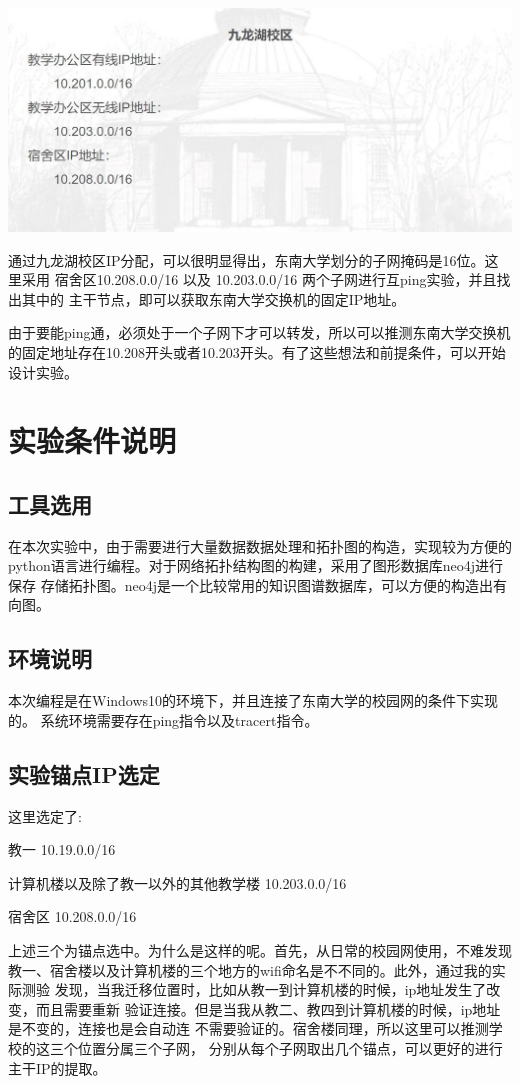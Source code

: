 \documentclass{article} %
\begin{document}
    \includegraphics[scale=0.5]{pic/九龙湖ip地址分配.JPG}
    \\
    \par 通过九龙湖校区IP分配，可以很明显得出，东南大学划分的子网掩码是16位。这里采用
    宿舍区10.208.0.0/16 以及 10.203.0.0/16 两个子网进行互ping实验，并且找出其中的
    主干节点，即可以获取东南大学交换机的固定IP地址。
    \par 由于要能ping通，必须处于一个子网下才可以转发，所以可以推测东南大学交换机
    的固定地址存在10.208开头或者10.203开头。有了这些想法和前提条件，可以开始设计实验。
    \section{\LARGE 实验条件说明}
        \subsection{\Large 工具选用}
        \par 在本次实验中，由于需要进行大量数据数据处理和拓扑图的构造，实现较为方便的
        python语言进行编程。对于网络拓扑结构图的构建，采用了图形数据库neo4j进行保存
        存储拓扑图。neo4j是一个比较常用的知识图谱数据库，可以方便的构造出有向图。
        \subsection{\Large 环境说明}
        \par 本次编程是在Windows10的环境下，并且连接了东南大学的校园网的条件下实现的。
        系统环境需要存在ping指令以及tracert指令。
        \subsection{\Large 实验锚点IP选定}
        \par 这里选定了:
        \par 教一 10.19.0.0/16 
        \par 计算机楼以及除了教一以外的其他教学楼 10.203.0.0/16
        \par 宿舍区 10.208.0.0/16
        \par 上述三个为锚点选中。为什么是这样的呢。首先，从日常的校园网使用，不难发现
        教一、宿舍楼以及计算机楼的三个地方的wifi命名是不不同的。此外，通过我的实际测验
        发现，当我迁移位置时，比如从教一到计算机楼的时候，ip地址发生了改变，而且需要重新
        验证连接。但是当我从教二、教四到计算机楼的时候，ip地址是不变的，连接也是会自动连
        不需要验证的。宿舍楼同理，所以这里可以推测学校的这三个位置分属三个子网，
        分别从每个子网取出几个锚点，可以更好的进行主干IP的提取。
\end{document}
